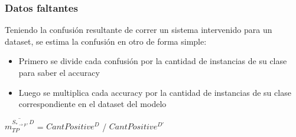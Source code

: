 \begin{frame}
\frametitle{Datos faltantes}
Teniendo la confusi\'on resultante de correr un sistema intervenido para un dataset, se estima la confusi\'on en otro de forma simple: \\
\vspace{3mm}
\begin{itemize}
\item Primero se divide cada confusi\'on por la cantidad de instancias de su clase para saber el accuracy
\item Luego se multiplica cada accuracy por la cantidad de instancias de su clase correspondiente en el dataset del modelo
\end{itemize}
\vspace{3mm}
$\overline{\text{$m_{TP}^{S_{*\rightarrow p}, D}$}}$ = \IPTPDP * $CantPositive^{D}$ / $CantPositive^{D'}$ 
\end{frame}